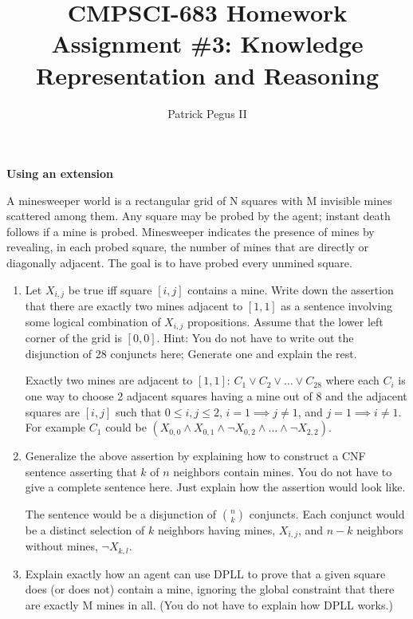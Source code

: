 \documentclass[12pt]{article}
\newenvironment{problem}[2][Problem]{\begin{trivlist}
\item[\hskip \labelsep {\bfseries #1}\hskip \labelsep {\bfseries #2.}]}{\end{trivlist}}
\begin{document}

\title{CMPSCI-683 Homework Assignment \#3: Knowledge Representation and Reasoning}
\author{Patrick Pegus II}
\maketitle

\textbf{Using an extension}

\begin{problem}{1}
	A minesweeper world is a rectangular grid of N squares with M invisible mines scattered among them.
	Any square may be probed by the agent; instant death follows if a mine is probed.
	Minesweeper indicates the presence of mines by revealing, in each probed square, the number of mines that are directly or diagonally adjacent.
	The goal is to have probed every unmined square.
	\begin{enumerate}
		\item Let $X_{i,j}$ be true iff square $[i,j]$ contains a mine.
			Write down the assertion that there are exactly two mines adjacent to $[1,1]$ as a sentence involving some logical combination of $X_{i,j}$ propositions.
			Assume that the lower left corner of the grid is $[0,0]$.
			Hint: You do not have to write out the disjunction of 28 conjuncts here; Generate one and explain the rest.

			\vspace{0.25cm}
			Exactly two mines are adjacent to $[1,1]$: $C_1 \vee C_2 \vee \dots \vee C_{28}$ where each $C_i$ is one
			way to choose 2 adjacent squares having a mine out of 8 and the adjacent squares are
			$[i,j]$ such that $0 \le i,j \le 2$, $i=1 \implies j \neq 1$, and $j=1 \implies i \neq 1$.
			For example $C_1$ could be $\left(X_{0,0} \wedge X_{0,1} \wedge \neg X_{0,2} \wedge \dots \wedge \neg X_{2,2}\right)$.
		\item Generalize the above assertion by explaining how to construct a CNF sentence asserting that $k$ of $n$ neighbors contain mines.
			You do not have to give a complete sentence here.
			Just explain how the assertion would look like.

			\vspace{0.25cm}
			The sentence would be a disjunction of ${{n}\choose{k}}$ conjuncts.
			Each conjunct would be a distinct selection of $k$ neighbors having mines, $X_{i,j}$,
			and $n-k$ neighbors without mines, $\neg X_{k,l}$.
		\item Explain exactly how an agent can use DPLL to prove that a given square does (or does not) contain a mine,
			ignoring the global constraint that there are exactly M mines in all.
			(You do not have to explain how DPLL works.)

			\vspace{0.25cm}
	\end{enumerate}
\end{problem}
\end{document}
